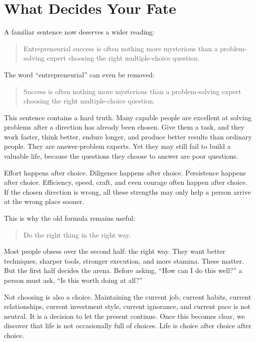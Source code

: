 \chapter{What Decides Your Fate}

A familiar sentence now deserves a wider reading:

\begin{quote}
Entrepreneurial success is often nothing more mysterious than a problem-solving expert choosing the right multiple-choice question.
\end{quote}

The word ``entrepreneurial'' can even be removed:

\begin{quote}
Success is often nothing more mysterious than a problem-solving expert choosing the right multiple-choice question.
\end{quote}

This sentence contains a hard truth. Many capable people are excellent at solving problems after a direction has already been chosen. Give them a task, and they work faster, think better, endure longer, and produce better results than ordinary people. They are answer-problem experts. Yet they may still fail to build a valuable life, because the questions they choose to answer are poor questions.

Effort happens after choice. Diligence happens after choice. Persistence happens after choice. Efficiency, speed, craft, and even courage often happen after choice. If the chosen direction is wrong, all these strengths may only help a person arrive at the wrong place sooner.

This is why the old formula remains useful:

\begin{quote}
Do the right thing in the right way.
\end{quote}

Most people obsess over the second half: the right way. They want better techniques, sharper tools, stronger execution, and more stamina. These matter. But the first half decides the arena. Before asking, ``How can I do this well?'' a person must ask, ``Is this worth doing at all?''

Not choosing is also a choice. Maintaining the current job, current habits, current relationships, current investment style, current ignorance, and current pace is not neutral. It is a decision to let the present continue. Once this becomes clear, we discover that life is not occasionally full of choices. Life is choice after choice after choice.

